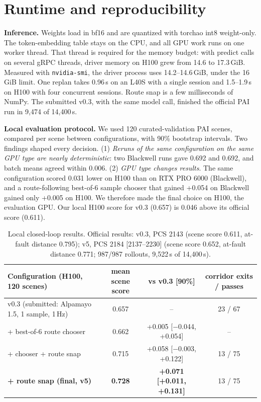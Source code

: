 \documentclass{article}
\begin{document}
\section{Runtime and reproducibility}
\textbf{Inference.} Weights load in bf16 and are quantized with torchao int8 weight-only. The token-embedding table
stays on the CPU, and all GPU work runs on one worker thread. That thread is required for the memory budget: with
predict calls on several gRPC threads, driver memory on H100 grew from 14.6 to 17.3\,GiB. Measured with
\texttt{nvidia-smi}, the driver process uses 14.2--14.6\,GiB, under the 16\,GiB limit. One replan takes 0.96\,s on an
L40S with a single session and 1.5--1.9\,s on H100 with four concurrent sessions. Route snap is a few milliseconds of
NumPy. The submitted v0.3, with the same model call, finished the official PAI run in 9{,}474 of 14{,}400\,s.

\textbf{Local evaluation protocol.} We used 120 curated-validation PAI scenes, compared per scene between
configurations, with 90\% bootstrap intervals. Two findings shaped every decision. (1) \emph{Reruns of the same
configuration on the same GPU type are nearly deterministic}: two Blackwell runs gave 0.692 and 0.692, and batch
means agreed within 0.006. (2) \emph{GPU type changes results}. The same configuration scored 0.031 lower on H100
than on RTX PRO 6000 (Blackwell), and a route-following best-of-6 sample chooser that gained +0.054 on Blackwell
gained only +0.005 on H100. We therefore made the final choice on H100, the evaluation GPU. Our local H100 score for
v0.3 (0.657) is 0.046 above its official score (0.611).

\begin{table}[h]
\centering\small
\begin{tabular}{lccc}
\toprule
Configuration (H100, 120 scenes) & mean scene score & vs v0.3 [90\%] & corridor exits / passes \\
\midrule
v0.3 (submitted: Alpamayo 1.5, 1 sample, 1\,Hz) & 0.657 & -- & 23 / 67 \\
+ best-of-6 route chooser & 0.662 & +0.005 [$-$0.044, +0.054] & -- \\
+ chooser + route snap & 0.715 & +0.058 [$-$0.003, +0.122] & 13 / 75 \\
\textbf{+ route snap (final, v5)} & \textbf{0.728} & \textbf{+0.071 [+0.011, +0.131]} & 13 / 75 \\
\bottomrule
\end{tabular}
\caption{Local closed-loop results. Official results: v0.3, PCS 2143 (scene score 0.611, at-fault distance 0.795);
v5, PCS 2184 [2137--2230] (scene score 0.652, at-fault distance 0.771; 987/987 rollouts, 9{,}522\,s of 14{,}400\,s).}
\label{tab:main}
\end{table}
\end{document}
